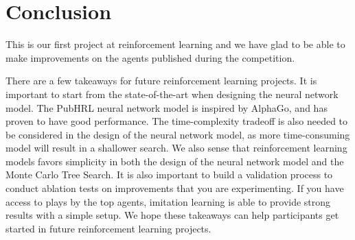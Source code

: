 


\section{Conclusion}

This is our first project at reinforcement learning and we have glad to be able to make improvements on the agents published during the competition.

There are a few takeaways for future reinforcement learning projects. It is important to start from the state-of-the-art when designing the neural network model. The PubHRL neural network model is inspired by AlphaGo, and has proven to have good performance. The time-complexity tradeoff is also needed to be considered in the design of the neural network model, as more time-consuming model will result in a shallower search. We also sense that reinforcement learning models favors simplicity in both the design of the neural network model and the Monte Carlo Tree Search. It is also important to build a validation process to conduct ablation tests on improvements that you are experimenting. If you have access to plays by the top agents, imitation learning is able to provide strong results with a simple setup. We hope these takeaways can help participants get started in future reinforcement learning projects.